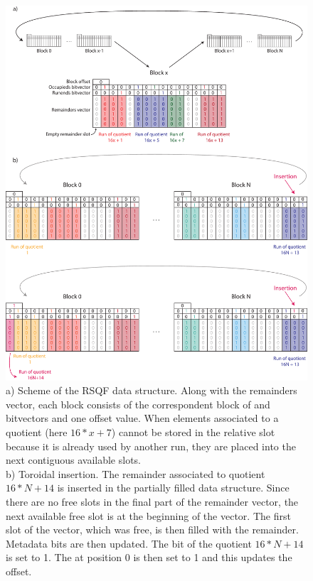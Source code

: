 \begin{figure}[h!]
	\centering
	\includegraphics[width=\linewidth]{figures/kmer_methods/cqf_toricity_export.pdf}
	\caption[The RSQF data structure scheme and toroidal property]{a) Scheme of the RSQF data structure. Along with the remainders vector, each block consists of the correspondent block of \occs and \rends bitvectors and one offset value. When elements associated to a quotient (here $16*x + 7$) cannot be stored in the relative slot because it is already used by another run, they are placed into the next contiguous available slots.\\ b) Toroidal insertion. The remainder associated to quotient $16*N + 14$ is inserted in the partially filled data structure. Since there are no free slots in the final part of the remainder vector, the next available free slot is at the beginning of the vector. The first slot of the vector, which was free, is then filled with the remainder. Metadata bits are then updated. The \occ bit of the quotient $16*N + 14$ is set to 1. The \rend at position 0 is then set to 1 and this updates the offset.} 
	\label{fig:cqf_toricity}
\end{figure}

